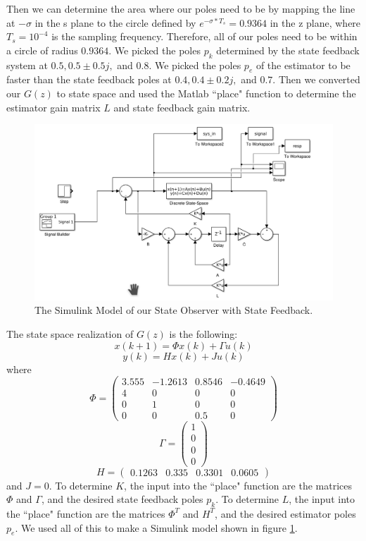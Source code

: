 \documentclass[11pt]{article}
\begin{document}
Then we can determine the area where our poles need to be by mapping the line at $-\sigma$ in the s plane to the circle defined by $e^{-\sigma*T_{s}}=0.9364$ in the z plane, where $T_{s}=10^{-4}$ is the sampling frequency. Therefore, all of our poles need to be within a circle of radius $0.9364$. We picked the poles $p_{k}$ determined by the state feedback system at $0.5, 0.5\pm 0.5j,$ and $0.8$. We picked the poles $p_{e}$ of the estimator to be faster than the state feedback poles at $0.4, 0.4\pm 0.2j,$ and $0.7$. Then we converted our $G(z)$ to state space and used the Matlab ``place" function to determine the estimator gain matrix $L$ and state feedback gain matrix.
\begin{figure}[H]
    \centering
    \includegraphics[width=\textwidth]{observer.png}
    \caption{The Simulink Model of our State Observer with State Feedback.}
    \label{fig:observer}
\end{figure}
The state space realization of $G(z)$ is the following:
\[ x(k+1) = \Phi x(k) + \Gamma u(k) \]
\[ y(k) = H x(k) + Ju(k) \]
where \[ \Phi = \left( \begin{array}{cccc}
3.555 & -1.2613 & 0.8546 & -0.4649 \\
4 & 0 & 0 & 0 \\
0 & 1 & 0 & 0\\
0 & 0 & 0.5 & 0 
\end{array} \right)\]
\[\Gamma = \left( \begin{array}{c}
1 \\
 0 \\
 0\\
 0 
\end{array} \right)\]
\[ H = \left( \begin{array}{cccc}
0.1263 & 0.335 & 0.3301 & 0.0605
\end{array} \right)\]
and $J = 0$.
To determine $K$, the input into the ``place" function are the matrices $\Phi$ and $\Gamma$, and the desired state feedback poles $p_{k}$. To determine $L$, the input into the ``place" function are the matrices $\Phi^{T}$ and $H^{T}$, and the desired estimator poles $p_{e}$. We used all of this to make a Simulink model shown in figure \ref{fig:observer}.
\end{document}
